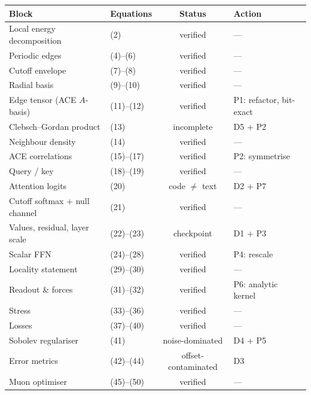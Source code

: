 \documentclass[10pt,a4paper]{article}
\newcommand{\OK}[1]{\textcolor{OKgreen}{#1}}
\newcommand{\BAD}[1]{\textcolor{BADred}{#1}}
\newcommand{\NEW}[1]{\textcolor{NEWblue}{#1}}
\newcommand{\DER}[1]{\textcolor{DERIVorange}{#1}}
\begin{document}
\begin{center}\footnotesize
\begin{tabular}{@{}llcl@{}}
\toprule
\textbf{Block} & \textbf{Equations} & \textbf{Status} & \textbf{Action}\\
\midrule
Local energy decomposition      & (2)          & \OK{verified}  & --- \\
Periodic edges                  & (4)--(6)     & \OK{verified}  & --- \\
Cutoff envelope                 & (7)--(8)     & \OK{verified}  & --- \\
Radial basis                    & (9)--(10)    & \OK{verified}  & --- \\
Edge tensor (ACE $A$-basis)     & (11)--(12)   & \OK{verified}  & \NEW{P1: refactor, bit-exact} \\
Clebsch--Gordan product         & (13)         & \BAD{incomplete} & \BAD{D5} + \NEW{P2} \\
Neighbour density               & (14)         & \OK{verified}  & --- \\
ACE correlations                & (15)--(17)   & \OK{verified}  & \NEW{P2: symmetrise} \\
Query / key                     & (18)--(19)   & \OK{verified}  & --- \\
Attention logits                & (20)         & \BAD{code $\neq$ text} & \BAD{D2} + \NEW{P7} \\
Cutoff softmax + null channel   & (21)         & \OK{verified}  & --- \\
Values, residual, layer scale   & (22)--(23)   & \BAD{checkpoint} & \BAD{D1} + \NEW{P3} \\
Scalar FFN                      & (24)--(28)   & \OK{verified}  & \DER{P4: rescale} \\
Locality statement              & (29)--(30)   & \OK{verified}  & --- \\
Readout \& forces               & (31)--(32)   & \OK{verified}  & \DER{P6: analytic kernel} \\
Stress                          & (33)--(36)   & \OK{verified}  & --- \\
Losses                          & (37)--(40)   & \OK{verified}  & --- \\
Sobolev regulariser             & (41)         & \BAD{noise-dominated} & \BAD{D4} + \DER{P5} \\
Error metrics                   & (42)--(44)   & \BAD{offset-contaminated} & \BAD{D3} \\
Muon optimiser                  & (45)--(50)   & \OK{verified}  & --- \\
\bottomrule
\end{tabular}
\end{center}
\end{document}
